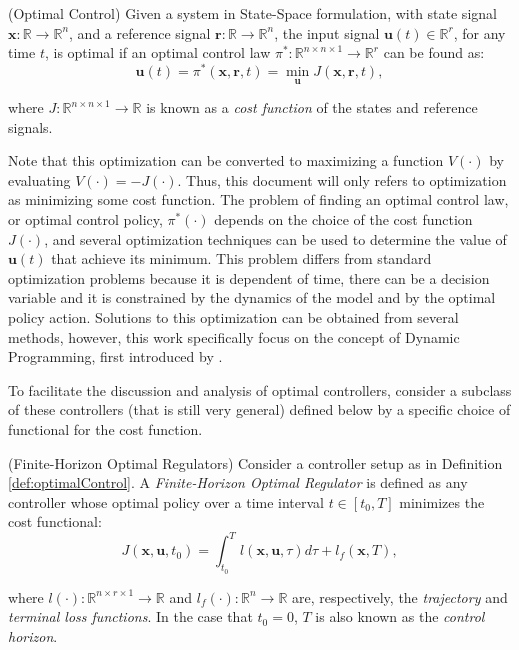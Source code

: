 \documentclass[a4paper,11pt]{book}
\numberwithin{figure}{chapter}
\numberwithin{equation}{chapter}
\numberwithin{table}{chapter}
\theoremstyle{definition}
\newtheorem{definition}{Definition}[chapter]
\newcounter{boxed-theorem}
\newcounter{boxed-lemma}
\newcounter{boxed-definition}
\newenvironment{boxed-definition}[1]
{\colorlet{shadecolor}{pastelYellow!15} \begin{shaded} \begin{definition}{#1}}
{\end{definition} \end{shaded}}
\newcounter{boxed-example}
\begin{document}
\begin{boxed-definition}{(Optimal Control)} \label{def:optimalControl}
Given a system in State-Space formulation, with state signal $\bm{x} : \mathbb{R} \rightarrow \mathbb{R}^{n}$, and a reference signal $\bm{r} : \mathbb{R} \rightarrow \mathbb{R}^{n}$, the input signal $\bm{u}	(t) \in \mathbb{R}^r$, for any time $t$, is optimal if an optimal control law $\pi^* : \mathbb{R}^{n \times n \times 1} \rightarrow \mathbb{R}^r$ can be found as:
    \begin{equation}
        \bm{u}(t) = \pi^*(\bm{x}, \bm{r}, t) = \min_{\bm{u}} J(\bm{x}, \bm{r}, t)
    ,\end{equation}
    
\noindent where $J : \mathbb{R}^{n \times n \times 1} \rightarrow \mathbb{R}$ is known as a \textit{cost function} of the states and reference signals.
\end{boxed-definition}

Note that this optimization can be converted to maximizing a function $V(\cdot)$ by evaluating $V(\cdot) = -J(\cdot)$. Thus, this document will only refers to optimization as minimizing some cost function. The problem of finding an optimal control law, or optimal control policy, $\pi^*(\cdot)$ depends on the choice of the cost function $J(\cdot)$, and several optimization techniques can be used to determine the value of $\bm{u}(t)$ that achieve its minimum. This problem differs from standard optimization problems because it is dependent of time, there can be a decision variable and it is constrained by the dynamics of the model and by the optimal policy action. Solutions to this optimization can be obtained from several methods, however, this work specifically focus on the concept of Dynamic Programming, first introduced by \cite{Bellman:1954}.

To facilitate the discussion and analysis of optimal controllers, consider a subclass of these controllers (that is still very general) defined below by a specific choice of functional for the cost function.

\begin{boxed-definition}{(Finite-Horizon Optimal Regulators)} \label{def:finiteHorizonOC}
    Consider a controller setup as in Definition \ref{def:optimalControl}. A \textit{Finite-Horizon Optimal Regulator} is defined as any controller whose optimal policy over a time interval $t \in [t_0, T]$ minimizes the cost functional:
    \begin{equation}
        J(\bm{x}, \bm{u}, t_0) = \int_{t_0}^T l(\bm{x}, \bm{u}, \tau) d \tau + l_f(\bm{x}, T)
    ,\end{equation}
    
    \noindent where $l(\cdot) : \mathbb{R}^{n \times r \times 1} \rightarrow \mathbb{R}$ and $l_f(\cdot) : \mathbb{R}^{n} \rightarrow \mathbb{R}$ are, respectively, the \textit{trajectory} and \textit{terminal loss functions}. In the case that $t_0 = 0$, $T$ is also known as the \textit{control horizon}.
\end{boxed-definition}
\end{document}
